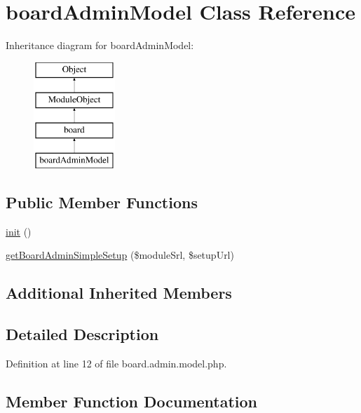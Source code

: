 \hypertarget{classboardAdminModel}{}\section{board\+Admin\+Model Class Reference}
\label{classboardAdminModel}
Inheritance diagram for board\+Admin\+Model\+:\begin{figure}[H]
\begin{center}
\leavevmode
\includegraphics[height=4.000000cm]{classboardAdminModel}
\end{center}
\end{figure}
\subsection*{Public Member Functions}
\begin{DoxyCompactItemize}
\item 
\hyperlink{classboardAdminModel_a93e03d7310fcdba8892e43de7fb532d0}{init} ()
\item 
\hyperlink{classboardAdminModel_a797f234de297b980f7fb66ab45959ad3}{get\+Board\+Admin\+Simple\+Setup} (\$module\+Srl, \$setup\+Url)
\end{DoxyCompactItemize}
\subsection*{Additional Inherited Members}


\subsection{Detailed Description}


Definition at line 12 of file board.\+admin.\+model.\+php.



\subsection{Member Function Documentation}
\mbox{\label{classboardAdminModel_a797f234de297b980f7fb66ab45959ad3}} 
